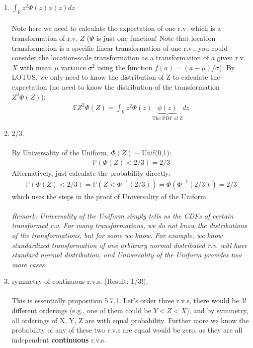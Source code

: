 

\setcounter{theorem}{55}
\begin{exercise}[BH.5.56]
\begin{solution}
    \begin{enumerate}
	    \item $\int_{\mathbb{R}}z^2\Phi(z)\phi(z)dz $~\\~\\
    	Note here we need to calculate the expectation of one r.v. which is a transformation of r.v. $Z$ ($\Phi$ is just one function! Note that location transformation is a specific linear transformation of one r.v., you could consider the location-scale transformation as a transformation of a given r.v. $X$ with mean $\mu$ variance $\sigma^2$ using the function $f(a)=(a-\mu)/\sigma$).	
    	By LOTUS, we only need to know the distribution of Z to calculate the expectation (no need to know the distribution of the transformation $Z^2\Phi(Z)$):
    	\begin{align*}
    		\mathbb{E}Z^2\Phi(Z) = \int_{\mathbb{R}}z^2\Phi(z) \underbrace{\phi(z)}_{\text{The PDF of Z}}dz
    	\end{align*}
    	\item 2/3.\\~\\
    	By Universality of the Uniform, $\Phi(Z)\sim$Unif(0,1):
    	\begin{align*}
    		\mathbb{P}\left(\Phi(Z) < 2/3 \right)=2/3
    	\end{align*}
    	Alternatively, just calculate the probability directly:
    	\begin{align*}
    		\mathbb{P}\left(\Phi(Z) < 2/3 \right)=\mathbb{P}\left(Z < \Phi^{-1}(2/3) \right)=\Phi\left( \Phi^{-1}(2/3) \right) = 2/3
    	\end{align*}
    	which uses the steps in the proof of Universality of the Uniform. 
    	~\\~~\\
    	\textit{Remark: Universality of the Uniform simply tells us the CDFs of certain transformed r.v. For many transformations, we do not know the distributions of the transformations, but for some we know. For example, we know standardized transformation of one arbitrary normal distributed r.v. will have standard normal distribution, and  Universality of the Uniform provides two more cases.}
    	\item symmetry of continuous r.v.s. (Result: 1/3!).\\~\\
    	This is essentially proposition 5.7.1. 
    	Let's order three r.v.s, there would be 3! different orderings (e.g., one of them could be $Y<Z<X$), and by symmetry, all orderings of X, Y, Z are with equal probability. 
    	Further more we know the probability of any of these two r.v.s are equal would be zero, as they are all independent \textbf{continuous} r.v.s. 
    	

\end{enumerate}
\end{solution}
\end{exercise}
